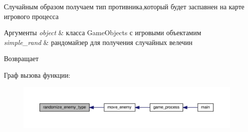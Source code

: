 Случайным образом получаем тип противника,который будет заспавнен на карте игрового процесса 


\begin{DoxyParams}{Аргументы}
{\em object} & класса Game\+Objects с игровыми объектамим \\
\hline
{\em simple\+\_\+rand} & рандомайзер для получения случайных велечин \\
\hline
\end{DoxyParams}
\begin{DoxyReturn}{Возвращает}

\end{DoxyReturn}


Граф вызова функции\+:\nopagebreak
\begin{figure}[H]
\begin{center}
\leavevmode
\includegraphics[width=350pt]{group__enemyHandler_ga21c57a411b6aa06a0f36c9eefab38b5b_icgraph}
\end{center}
\end{figure}


